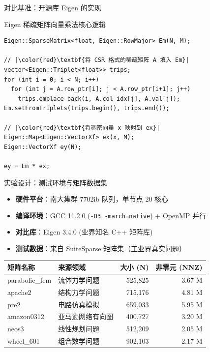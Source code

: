 \documentclass{beamer}
\begin{document}
\begin{frame}[fragile]{对比基准：开源库 Eigen 的实现}
	\begin{block}{Eigen 稀疏矩阵向量乘法核心逻辑}
		\vspace{-0.1cm}
		\begin{lstlisting}
Eigen::SparseMatrix<float, Eigen::RowMajor> Em(N, M);

// |\color{red}\textbf{将 CSR 格式的稀疏矩阵 A 填入 Em}|
vector<Eigen::Triplet<float>> trips;
for (int i = 0; i < N; i++)
  for (int j = A.row_ptr[i]; j < A.row_ptr[i+1]; j++)
    trips.emplace_back(i, A.col_idx[j], A.val[j]);
Em.setFromTriplets(trips.begin(), trips.end());

// |\color{red}\textbf{将稠密向量 x 映射到 ex}|
Eigen::Map<Eigen::VectorXf> ex(x, M);
Eigen::VectorXf ey(N);

ey = Em * ex;
		\end{lstlisting}
	\end{block}
\end{frame}

\begin{frame}{实验设计：测试环境与矩阵数据集}
	\begin{itemize}
		\item \textbf{硬件平台}：南大集群 7702ib 队列，单节点 20 核心
		\item \textbf{编译环境}：GCC 11.2.0 (\texttt{-O3 -march=native}) + OpenMP 并行
		\item \textbf{对比库}：Eigen 3.4.0 (业界知名 C++ 矩阵库)
		\item \textbf{测试数据}：来自 SuiteSparse 矩阵集（工业界真实问题）
	\end{itemize}
	
	\vskip 0.3cm
	\begin{table}
		\small
		\centering
		\begin{tabular}{l|l|r|r}
			\hline
			\textbf{矩阵名称} & \textbf{来源领域} & \textbf{大小 (N)} & \textbf{非零元 (NNZ)} \\ \hline
			parabolic\_fem & 流体力学问题 & 525,825 & 3.67 M \\
			apache2 & 结构力学问题 & 715,176 & 4.81 M \\
			pre2 & 电路仿真模拟 & 659,033 & 5.95 M \\
			amazon0312 & 亚马逊网络有向图 & 400,727 & 3.20 M \\
			neos3 & 线性规划问题 & 512,209 & 2.05 M \\
			wheel\_601 & 组合数学问题 & 902,103 & 2.17 M \\ \hline
		\end{tabular}
	\end{table}
\end{frame}
\end{document}
